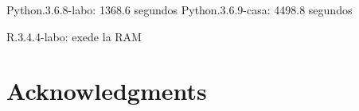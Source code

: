 \documentclass[article]{jss}
\newif\ifen
\newif\ifes
\newcommand{\en}[1]{\ifen#1\fi}
\newcommand{\es}[1]{\ifes#1\fi}
\begin{document}
Python.3.6.8-labo: 1368.6 segundos
Python.3.6.9-casa: 4498.8 segundos

R.3.4.4-labo: exede la RAM
% 


\section*{Acknowledgments}

%
\en{Special thanks to Heungsub Lee for having published the basic TrueSkill model in Python.}
\es{Agradecemos especialmente a Heungsub Lee por haber publicado el modelo básico de TrueSkill en Python.}
\en{We also thank Matias Mazzanti for constructive discussions during the implementation of the method.}
\es{También agradecemos a Matias Mazantti por las discusiones constructivas durante la implementación del método.}
%
\en{This work is supported by Universidad de Buenos Aires (UBACyT \todo{ubacyt}), CONICET (\todo{conicet}), and ANPCyT (\todo{ANPCyT}).}
\es{Este trabajo fue apoyado por la Universidad de Buenos Aires (UBACyT \todo{ubacyt}), CONICET (\todo{conicet}), and ANPCyT (\todo{ANPCyT}).}

 


% 
\end{document}
